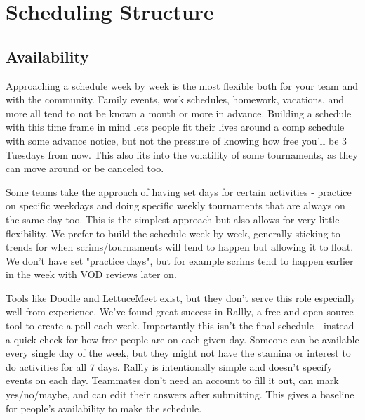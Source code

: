 \documentclass[12pt]{article}
\begin{document}
\section{Scheduling Structure}
\subsection{Availability}
Approaching a schedule week by week is the most flexible both for your team and with the community. Family events, work schedules, homework, vacations, and more all tend to not be known a month or more in advance. Building a schedule with this time frame in mind lets people fit their lives around a comp schedule with some advance notice, but not the pressure of knowing how free you'll be 3 Tuesdays from now. This also fits into the volatility of some tournaments, as they can move around or be canceled too. 

Some teams take the approach of having set days for certain activities - practice on specific weekdays and doing specific weekly tournaments that are always on the same day too. This is the simplest approach but also allows for very little flexibility. We prefer to build the schedule week by week, generally sticking to trends for when scrims/tournaments will tend to happen but allowing it to float. We don't have set "practice days", but for example scrims tend to happen earlier in the week with VOD reviews later on.

Tools like Doodle and LettuceMeet exist, but they don't serve this role especially well from experience. We've found great success in Rallly, a free and open source tool to create a poll each week. Importantly this isn't the final schedule - instead a quick check for how free people are on each given day. Someone can be available every single day of the week, but they might not have the stamina or interest to do activities for all 7 days. Rallly is intentionally simple and doesn't specify events on each day. Teammates don't need an account to fill it out, can mark yes/no/maybe, and can edit their answers after submitting. This gives a baseline for people's availability to make the schedule.
\end{document}

